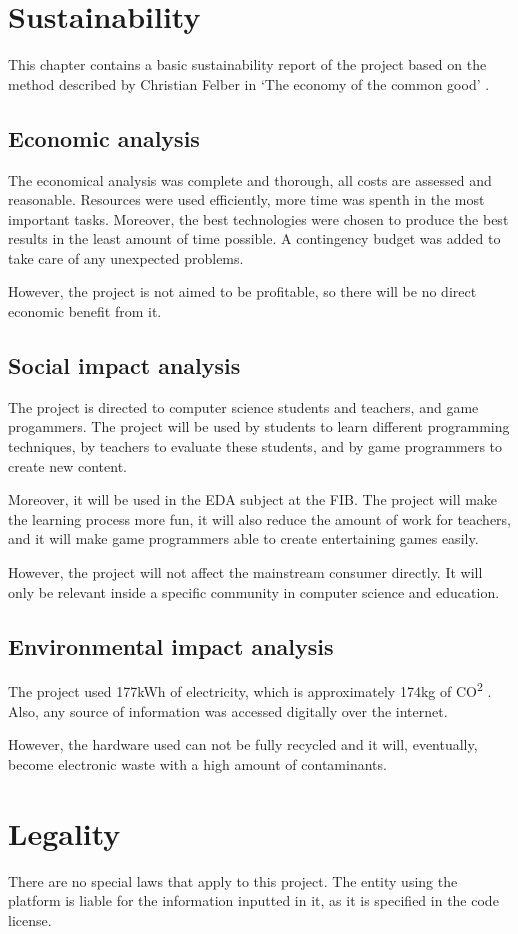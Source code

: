 \documentclass[a4paper,11pt,titlepage,abstract,numbers=noenddot,automark,mnsy,intlimits,rgb,dvipsnames]{report}
\begin{document}
\chapter{Sustainability}
This chapter contains a basic sustainability report of the project based on the method described by
Christian Felber in `The economy of the common good' \cite{sustainability_report}.
\section{Economic analysis}
The economical analysis was complete and thorough, all costs are assessed and reasonable.
Resources were used efficiently, more time was spenth in the most important tasks. Moreover, the best technologies
were chosen to produce the best results in the least amount of time possible. A contingency budget was added
to take care of any unexpected problems.

However, the project is not aimed to be profitable, so there will be no direct economic benefit from it.
\section{Social impact analysis}
The project is directed to computer science students and teachers, and game progammers. The project
will be used by students to learn different programming techniques, by teachers to evaluate these students, and
by game programmers to create new content.

Moreover, it will be used in the EDA subject at the FIB. The project will make the learning process more fun, it will also
reduce the amount of work for teachers, and it will make game programmers able to create entertaining games easily.

However, the project will not affect the mainstream consumer directly. It will only be relevant inside a specific
community in computer science and education.
\section{Environmental impact analysis}
The project used 177kWh of electricity, which is approximately 174kg of CO\textsuperscript{2} \cite{co2}.
Also, any source of information was accessed digitally over the internet.

However, the hardware used can not be fully recycled and it will, eventually, become electronic waste
with a high amount of contaminants.
\chapter{Legality}
There are no special laws that apply to this project. The entity using the platform
is liable for the information inputted in it, as it is specified in the code license.
\end{document}
